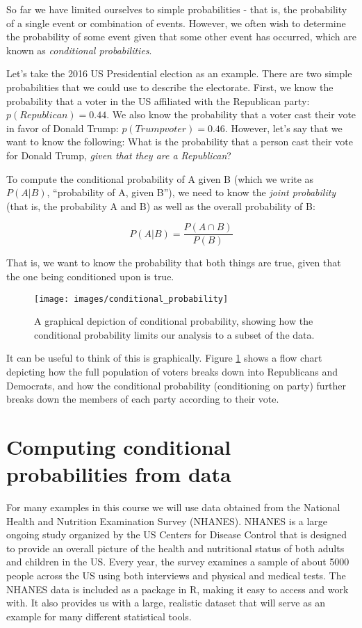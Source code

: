 \documentclass[]{book}
\theoremstyle{definition}
\theoremstyle{definition}
\theoremstyle{definition}
\theoremstyle{remark}
\begin{document}
So far we have limited ourselves to simple probabilities - that is, the
probability of a single event or combination of events. However, we
often wish to determine the probability of some event given that some
other event has occurred, which are known as \emph{conditional
probabilities}.

Let's take the 2016 US Presidential election as an example. There are
two simple probabilities that we could use to describe the electorate.
First, we know the probability that a voter in the US affiliated with
the Republican party: \(p(Republican) = 0.44\). We also know the
probability that a voter cast their vote in favor of Donald Trump:
\(p(Trump voter)=0.46\). However, let's say that we want to know the
following: What is the probability that a person cast their vote for
Donald Trump, \emph{given that they are a Republican}?

To compute the conditional probability of A given B (which we write as
\(P(A|B)\), ``probability of A, given B''), we need to know the
\emph{joint probability} (that is, the probability A and B) as well as
the overall probability of B:

\[
P(A|B) = \frac{P(A \cap B)}{P(B)}
\]

That is, we want to know the probability that both things are true,
given that the one being conditioned upon is true.

\begin{figure}
\texttt{[image: images/conditional\_probability]} \caption{A graphical depiction of conditional probability, showing how the conditional probability limits our analysis to a subset of the data.}\label{fig:conditionalProbability}
\end{figure}

It can be useful to think of this is graphically. Figure
\ref{fig:conditionalProbability} shows a flow chart depicting how the
full population of voters breaks down into Republicans and Democrats,
and how the conditional probability (conditioning on party) further
breaks down the members of each party according to their vote.

\section{Computing conditional probabilities from
data}\label{computing-conditional-probabilities-from-data}

For many examples in this course we will use data obtained from the
National Health and Nutrition Examination Survey (NHANES). NHANES is a
large ongoing study organized by the US Centers for Disease Control that
is designed to provide an overall picture of the health and nutritional
status of both adults and children in the US. Every year, the survey
examines a sample of about 5000 people across the US using both
interviews and physical and medical tests. The NHANES data is included
as a package in R, making it easy to access and work with. It also
provides us with a large, realistic dataset that will serve as an
example for many different statistical tools.
\end{document}
